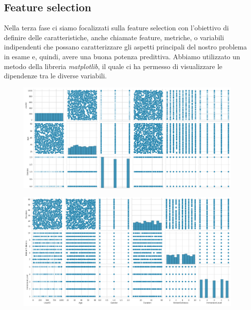 \newpage
\subsection{Feature selection}
Nella terza fase ci siamo focalizzati sulla feature selection con l’obiettivo di definire delle caratteristiche, anche chiamate feature, metriche, o variabili indipendenti che possano caratterizzare gli aspetti principali del nostro problema in esame e, quindi, avere una buona potenza predittiva. Abbiamo utilizzato un metodo della libreria \textit{matplotlib}, il quale ci ha permesso di visualizzare le dipendenze tra le diverse variabili.

\begin{figure}[h]
    \centering
    \includegraphics[width=\textwidth]{MetaClassAI_Documentazione/3/img/FeatureSelection_1.png}
\end{figure}
\begin{figure}[h]
    \centering
    \includegraphics[width=\textwidth]{MetaClassAI_Documentazione/3/img/FeatureSelection_2.png}
\end{figure}
